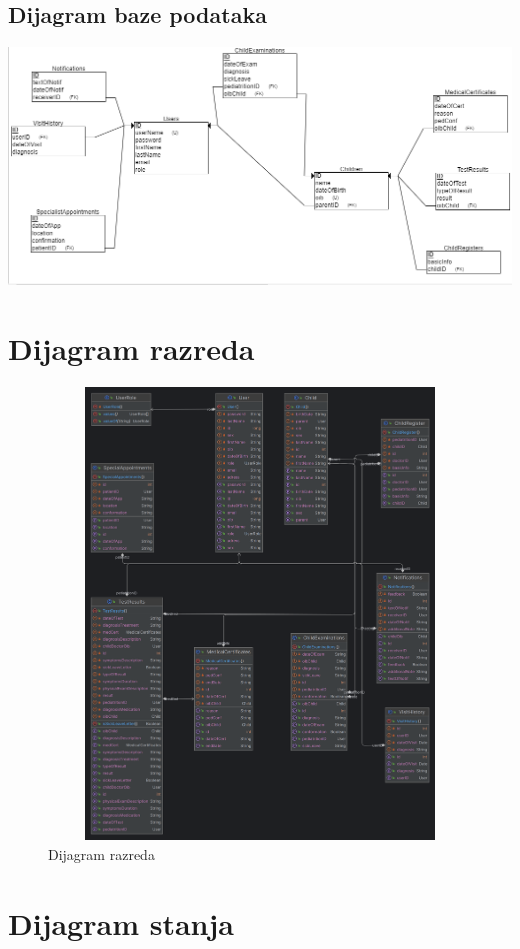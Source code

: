 			
			\subsection{Dijagram baze podataka}
				\includegraphics[scale=0.6]{dijagrami/Bazapodataka.PNG}
			
			\eject
			
			
		\section{Dijagram razreda}
		\begin{figure}[H]
			\includegraphics[width=15cm, height=12cm]{dijagrami/class_diagram.png}
			\caption{Dijagram razreda}
			\label{fig:classD}
		\end{figure}
		\eject
		
		\section{Dijagram stanja}
			
